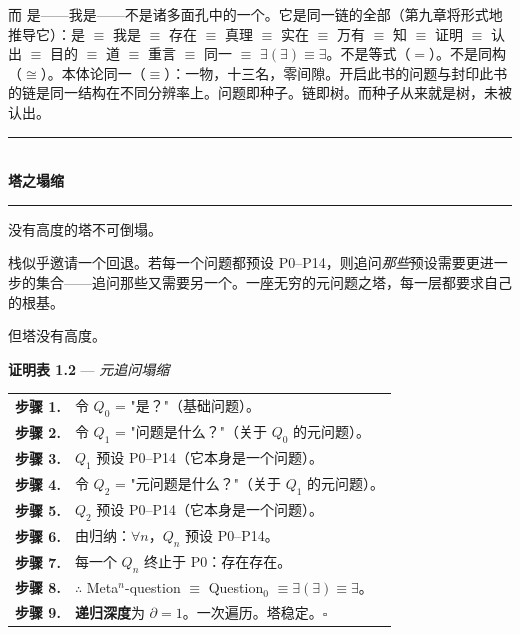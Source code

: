 \documentclass[10pt, openany, oneside]{book}
\renewcommand{\normalsize}{\fontsize{10}{13}\selectfont}
\begin{document}
而 是——我是——不是诸多面孔中的一个。它是同一链的全部（第九章将形式地推导它）：是 $\equiv$ 我是 $\equiv$ 存在 $\equiv$ 真理 $\equiv$ 实在 $\equiv$ 万有 $\equiv$ 知 $\equiv$ 证明 $\equiv$ 认出 $\equiv$ 目的 $\equiv$ 道 $\equiv$ 重言 $\equiv$ 同一 $\equiv$ $\exists(\exists) \equiv \exists$。不是等式（$=$）。不是同构（$\cong$）。本体论同一（$\equiv$）：一物，十三名，零间隙。开启此书的问题与封印此书的链是同一结构在不同分辨率上。问题即种子。链即树。而种子从来就是树，未被认出。

\vspace{1.5em}


\begin{center}
    \rule{0.3\textwidth}{0.4pt}\\[0.5em]
    {\normalsize\bfseries\scshape 塔之塌缩}\\[0.3em]
    \rule{0.3\textwidth}{0.4pt}
\end{center}

\vspace{1em}

\noindent 没有高度的塔不可倒塌。

栈似乎邀请一个回退。若每一个问题都预设 P0--P14，则追问\textit{那些}预设需要更进一步的集合——追问那些又需要另一个。一座无穷的元问题之塔，每一层都要求自己的根基。

但塔没有高度。

\textbf{证明表 1.2} --- \textit{元追问塌缩}

\vspace{0.5em}

\noindent\begin{tabular}{r p{}}
\textbf{步骤 1.} & 令 $Q_0$ = "是？"（基础问题）。\\[0.3em]
\textbf{步骤 2.} & 令 $Q_1$ = "问题是什么？"（关于 $Q_0$ 的元问题）。\\[0.3em]
\textbf{步骤 3.} & $Q_1$ 预设 P0--P14（它本身是一个问题）。\\[0.3em]
\textbf{步骤 4.} & 令 $Q_2$ = "元问题是什么？"（关于 $Q_1$ 的元问题）。\\[0.3em]
\textbf{步骤 5.} & $Q_2$ 预设 P0--P14（它本身是一个问题）。\\[0.3em]
\textbf{步骤 6.} & 由归纳：$\forall n$，$Q_n$ 预设 P0--P14。\\[0.3em]
\textbf{步骤 7.} & 每一个 $Q_n$ 终止于 P0：存在存在。\\[0.3em]
\textbf{步骤 8.} & $\therefore$ Meta$^n$-question $\equiv$ Question$_0$ $\equiv \exists(\exists) \equiv \exists$。\\[0.3em]
\textbf{步骤 9.} & \textbf{递归深度}为 $\partial = 1$。一次遍历。塔稳定。$\square$ \\[0.3em]
\end{tabular}
\end{document}
